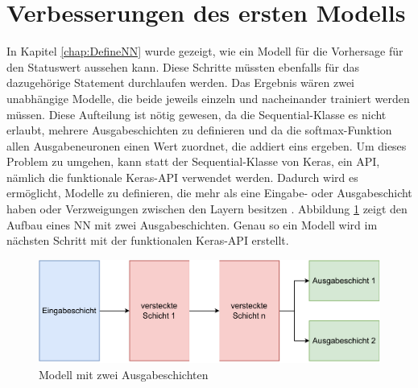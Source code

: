 \section{Verbesserungen des ersten Modells}
\label{chap:VerbesserungenNN}

In Kapitel \ref*{chap:DefineNN} wurde gezeigt, wie ein Modell für die Vorhersage für den Statuswert aussehen kann. Diese Schritte müssten ebenfalls für das dazugehörige Statement
durchlaufen werden. Das Ergebnis wären zwei unabhängige Modelle, die beide jeweils einzeln und nacheinander trainiert werden müssen. Diese Aufteilung ist nötig gewesen,
da die \glqq Sequential\grqq{}-Klasse es nicht erlaubt, mehrere Ausgabeschichten zu definieren und da die \glqq softmax\grqq{}-Funktion allen Ausgabeneuronen 
einen Wert zuordnet, die addiert eins ergeben. Um dieses Problem zu umgehen, kann statt der \glqq Sequential\grqq{}-Klasse von Keras, 
ein \ac{API}, nämlich die funktionale Keras-\ac{API} verwendet werden. 
Dadurch wird es ermöglicht, Modelle zu definieren, die mehr als eine Eingabe- oder Ausgabeschicht haben oder Verzweigungen zwischen den Layern besitzen \cite[vgl. S.299f.]{DL_PY}. 
Abbildung \ref*{fig:FunktionaleAPI} zeigt den Aufbau eines \ac{NN} mit zwei Ausgabeschichten. Genau so ein Modell wird im nächsten Schritt mit der funktionalen Keras-\ac{API} erstellt.

\begin{figure}[H]
    \centering
    \includegraphics[width=\textwidth]{abbildungen/NN_funktionaleAPI.pdf}
    \caption{Modell mit zwei Ausgabeschichten}
    \label{fig:FunktionaleAPI}
\end{figure}

